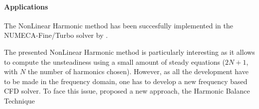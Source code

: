 \paragraph{Applications}
The NonLinear Harmonic method 
has been succesfully implemented
in the NUMECA-Fine/Turbo solver by 
\citet{Vilmin2006, Vilmin2007, Vilmin2009, Vilmin2013a}.

The presented NonLinear Harmonic method is particularly interesting
as it allows to compute the unsteadiness using a small amount 
of steady equations ($2N + 1$, with $N$ the number of harmonics chosen).
However, as all the development have to be made in the frequency domain,
one has to develop a new frequency based CFD solver. To face this issue,
\citet{Hall2002} proposed a new approach, the Harmonic Balance Technique
